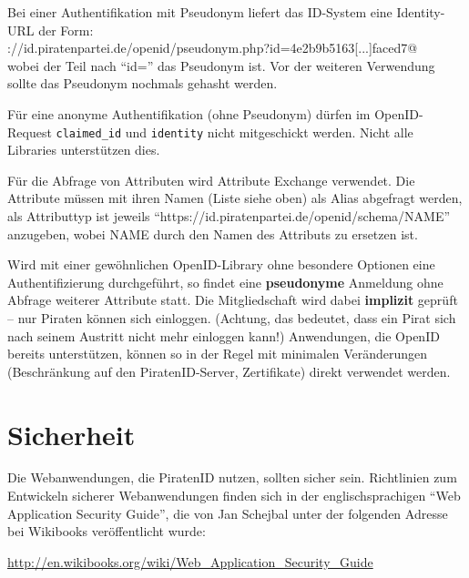 Bei einer Authentifikation mit Pseudonym liefert das ID-System eine Identity-URL der Form:\\
\verb@https://id.piratenpartei.de/openid/pseudonym.php?id=4e2b9b5163[...]faced7@\\
wobei der Teil nach "`id="' das Pseudonym ist. Vor der weiteren Verwendung sollte das Pseudonym nochmals gehasht werden.

Für eine anonyme Authentifikation (ohne Pseudonym) dürfen im OpenID-Request \texttt{claimed\_id} und \texttt{identity} nicht mitgeschickt werden.
Nicht alle Libraries unterstützen dies.

Für die Abfrage von Attributen wird Attribute Exchange verwendet.
Die Attribute müssen mit ihren Namen (Liste siehe oben) als Alias abgefragt werden,
als Attributtyp ist jeweils "`https://id.piratenpartei.de/openid/schema/NAME"' anzugeben, wobei NAME durch den Namen des Attributs zu ersetzen ist.

Wird mit einer gewöhnlichen OpenID-Library ohne besondere Optionen eine Authentifizierung durchgeführt,
so findet eine \textbf{pseudonyme} Anmeldung ohne Abfrage weiterer Attribute statt.
Die Mitgliedschaft wird dabei \textbf{implizit} geprüft -- nur Piraten können sich einloggen.
(Achtung, das bedeutet, dass ein Pirat sich nach seinem Austritt nicht mehr einloggen kann!)
Anwendungen, die OpenID bereits unterstützen, können so in der Regel mit minimalen Veränderungen (Beschränkung auf den PiratenID-Server, Zertifikate) direkt verwendet werden.


\newpage
\section{Sicherheit}

Die Webanwendungen, die PiratenID nutzen, sollten sicher sein.
Richtlinien zum Entwickeln sicherer Webanwendungen finden sich in der englischsprachigen "`Web Application Security Guide"',
die von Jan Schejbal unter der folgenden Adresse bei Wikibooks veröffentlicht wurde:

\url{http://en.wikibooks.org/wiki/Web_Application_Security_Guide}

